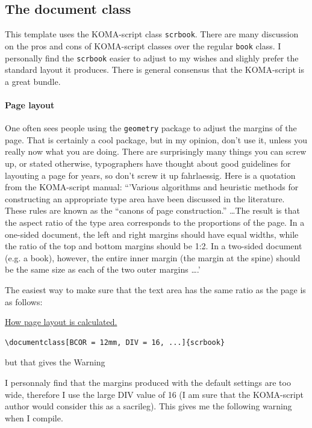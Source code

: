 \subsection{The document class}
This template uses the KOMA-script class \verb|scrbook|. There are many discussion on the pros and cons of KOMA-script classes over the regular \verb|book| class. I personally find the \verb|scrbook| easier to adjust to my wishes and slighly prefer the standard layout it produces. There is general consensus that the KOMA-script is a great bundle.

\paragraph{Page layout} One often sees people using the \verb|geometry| package to adjust the margins of the page. That is certainly a cool package, but in my opinion, don't use it, unless you really now what you are doing. There are surprisingly many things you can screw up, or stated otherwise, typographers have thought about good guidelines for layouting a page for years, so don't screw it up fahrlaessig.  
Here is a quotation from the KOMA-script manual:
``'Various algorithms and heuristic methods for constructing an appropriate type area have been
discussed in the literature. These rules are known as the ``canons of page construction.'' \ldots The result is that the
aspect ratio of the type area corresponds to the proportions of the page. In a one-sided document,
the left and right margins should have equal widths, while the ratio of the top and bottom margins
should be 1:2. In a two-sided document (e.g. a book), however, the entire inner margin (the margin at the spine) should be the same size as each of the two outer margins \ldots.'

The easiest way to make sure that the text area has the same ratio as the page is as follows:

\href{https://markov.htwsaar.de/tex-archive/macros/latex/contrib/koma-script/doc/scrguide-en.pdf}{How page layout is calculated.}

\begin{lstlisting}
\documentclass[BCOR = 12mm, DIV = 16, ...]{scrbook}
\end{lstlisting}


but that gives the Warning

I personnaly find that the margins produced with the default settings are too wide, therefore I use the large DIV value of 16 (I am sure that the KOMA-script author would consider this as a sacrileg). This gives me the following warning when I compile.

